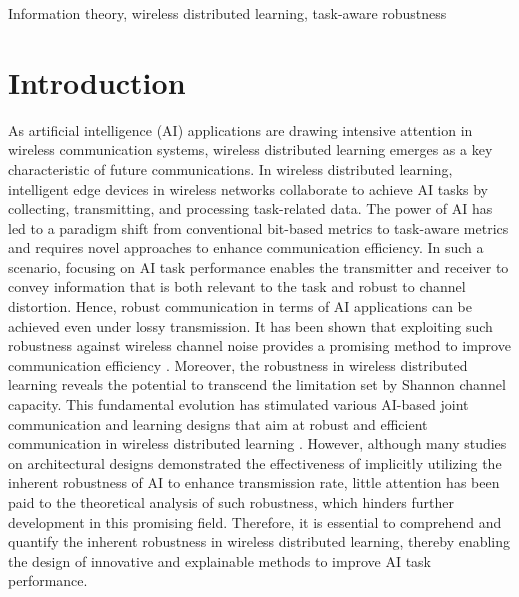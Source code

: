\documentclass[lettersize,journal]{IEEEtran}
\theoremstyle{definition}
\theoremstyle{plain}
\begin{document}
\begin{IEEEkeywords}
Information theory, wireless distributed learning, task-aware robustness
\end{IEEEkeywords}

\section{Introduction}

As artificial intelligence (AI) applications are drawing intensive attention in wireless communication systems, wireless distributed learning emerges as a key characteristic of future communications.
In wireless distributed learning, intelligent edge devices in wireless networks collaborate to achieve AI tasks by collecting, transmitting, and processing task-related data. 
The power of AI has led to a paradigm shift from conventional bit-based metrics to task-aware metrics and requires novel approaches to enhance communication efficiency.
In such a scenario, focusing on AI task performance enables the transmitter and receiver to convey information that is both relevant to the task and robust to channel distortion. Hence, robust communication in terms of AI applications can be achieved even under lossy transmission.
It has been shown that exploiting such robustness against wireless channel noise provides a promising method to improve communication efficiency \cite{IB}. Moreover, the robustness in wireless distributed learning reveals the potential to transcend the limitation set by Shannon channel capacity.
This fundamental evolution has stimulated various AI-based joint communication and learning designs that aim at robust and efficient communication in wireless distributed learning \cite{JSCC-text,JSCC-image,DeepSC}. 
However, although many studies on architectural designs demonstrated the effectiveness of implicitly utilizing the inherent robustness of AI to enhance transmission rate, little attention has been paid to the theoretical analysis of such robustness, which hinders further development in this promising field. Therefore, it is essential to comprehend and quantify the inherent robustness in wireless distributed learning, thereby enabling the design of innovative and explainable methods to improve AI task performance.
\end{document}
